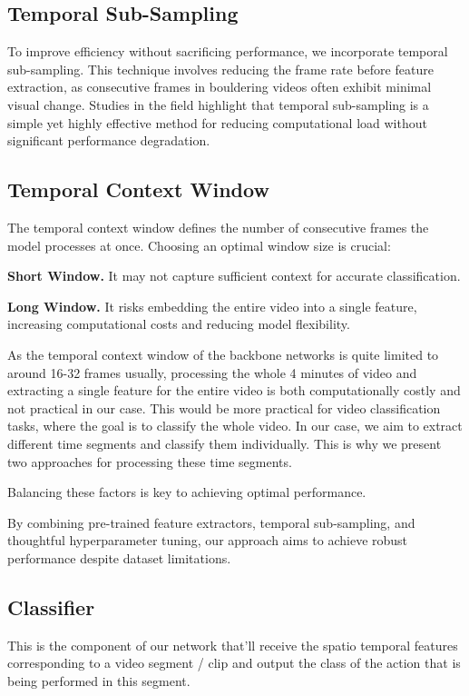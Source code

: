 \subsection{Temporal Sub-Sampling}
To improve efficiency without sacrificing performance, we incorporate temporal sub-sampling. This technique involves reducing the frame rate before feature extraction, as consecutive frames in bouldering videos often exhibit minimal visual change. Studies in the field highlight that temporal sub-sampling is a simple yet highly effective method for reducing computational load without significant performance degradation.

\subsection{Temporal Context Window}
The temporal context window defines the number of consecutive frames the model processes at once. Choosing an optimal window size is crucial:

\noindent\textbf{\small{Short Window.}}
It may not capture sufficient context for accurate classification.

\noindent\textbf{\small{Long Window.}}
It risks embedding the entire video into a single feature, increasing computational costs and reducing model flexibility.

As the temporal context window of the backbone networks is quite limited to around 16-32 frames usually, processing the whole 4 minutes of video and extracting a single feature for the entire video is both computationally costly and not practical in our case. This would be more practical for video classification tasks, where the goal is to classify the whole video. In our case, we aim to extract different time segments and classify them individually. This is why we present two approaches for processing these time segments.

Balancing these factors is key to achieving optimal performance.

By combining pre-trained feature extractors, temporal sub-sampling, and thoughtful hyperparameter tuning, our approach aims to achieve robust performance despite dataset limitations.

\subsection{Classifier}

This is the component of our network that'll receive the spatio temporal features corresponding to a video segment / clip and output the class of the action that is being performed in this segment.


